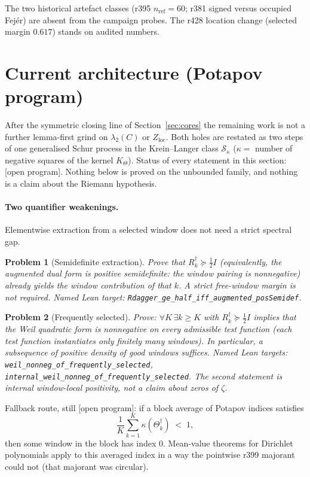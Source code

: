 \documentclass[11pt]{article}
\newtheorem{problem}{Problem}
\theoremstyle{remark}
\newcommand{\Rd}{R^{\dagger}}
\newcommand{\half}{\tfrac12}
\newcommand{\Zloc}{Z_{\mathrm{loc}}}
\newcommand{\Sk}{\mathcal{S}}
\newcommand{\gr}[1]{\textnormal{\small[#1]}}
\begin{document}
The two historical artefact classes (r395 $n_{\mathrm{ref}}=60$;
r381 signed versus occupied Fej\'er) are absent from the
campaign probes.  The r428 location change (selected margin
$0.617$) stands on audited numbers.

\section{Current architecture (Potapov program)}
\label{sec:potapov}

After the symmetric closing line of Section~\ref{sec:cores}
the remaining work is not a further lemma-first grind on
$\lambda_{2}(C)$ or $\Zloc$.  Both holes are restated as two
steps of one generalised Schur process in the Krein--Langer
class $\Sk_{\kappa}$ ($\kappa=$ number of negative squares of
the kernel $K_{\Theta}$).  Status of every statement in this
section: \gr{open program}.  Nothing below is proved on the
unbounded family, and nothing is a claim about the Riemann
hypothesis.

\paragraph{Two quantifier weakenings.}
Elementwise extraction from a selected window does not need a
strict spectral gap.

\begin{problem}[Semidefinite extraction]
\label{prob:semidef}
Prove that $\Rd_{k}\succeq\half I$ (equivalently, the
augmented dual form is positive \emph{semidefinite}: the
window pairing is nonnegative) already yields the window
contribution of that $k$.
A strict free-window margin is not required.
Named Lean target:
\texttt{Rdagger\_ge\_half\_iff\_augmented\_posSemidef}.
\end{problem}

\begin{problem}[Frequently selected]
\label{prob:freq}
Prove: $\forall K\,\exists k\ge K$ with
$\Rd_{k}\succeq\half I$ implies that the Weil quadratic form
is nonnegative on every admissible test function (each test
function instantiates only finitely many windows).  In
particular, a subsequence of positive density of good windows
suffices.  Named Lean targets:
\texttt{weil\_nonneg\_of\_frequently\_selected},
\texttt{internal\_weil\_nonneg\_of\_frequently\_selected}.
The second statement is internal window-local positivity, not a
claim about zeros of $\zeta$.
\end{problem}

Fallback route, still \gr{open program}: if a block average of
Potapov indices satisfies
\[
\frac1K\sum_{k=1}^{K}\kappa(\Theta_{k}^{\dagger})
\;<\;1,
\]
then some window in the block has index $0$.  Mean-value
theorems for Dirichlet polynomials apply to this averaged
index in a way the pointwise r399 majorant could not (that
majorant was circular).
\end{document}
